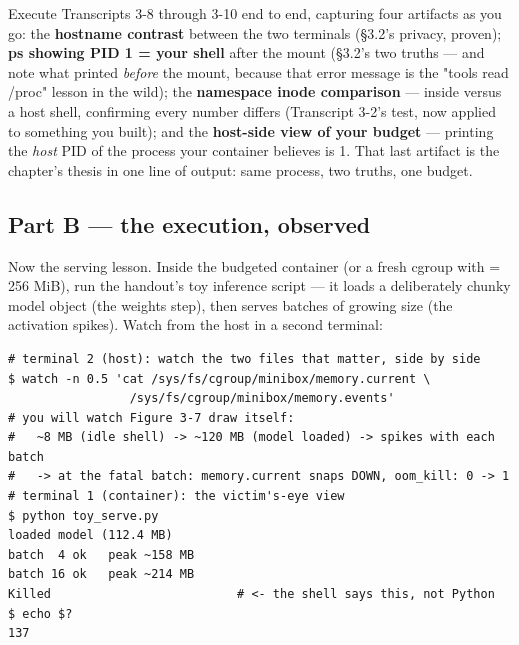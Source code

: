 Execute Transcripts 3-8 through 3-10 end to end, capturing four artifacts as you go: the \textbf{hostname contrast} between the two terminals (§3.2's privacy, proven); \textbf{ps showing PID 1 = your shell} after the  mount (§3.2's two truths — and note what  printed \textit{before} the mount, because that error message is the "tools read /proc" lesson in the wild); the \textbf{namespace inode comparison} —  inside versus a host shell, confirming every number differs (Transcript 3-2's test, now applied to something you built); and the \textbf{host-side view of your budget} —  printing the \textit{host} PID of the process your container believes is 1. That last artifact is the chapter's thesis in one line of output: same process, two truths, one budget.

\subsection*{Part B — the execution, observed}

Now the serving lesson. Inside the budgeted container (or a fresh cgroup with  = 256 MiB), run the handout's toy inference script — it loads a deliberately chunky model object (the weights step), then serves batches of growing size (the activation spikes). Watch from the host in a second terminal:

\begin{terminalbox}
\begin{Verbatim}[breaklines=true,breakanywhere=true,fontsize=\small,formatcom=\color{tbbtermfg},codes=\tbbcodeactive]
# terminal 2 (host): watch the two files that matter, side by side
$ watch -n 0.5 'cat /sys/fs/cgroup/minibox/memory.current \
                 /sys/fs/cgroup/minibox/memory.events'
# you will watch Figure 3-7 draw itself:
#   ~8 MB (idle shell) -> ~120 MB (model loaded) -> spikes with each batch
#   -> at the fatal batch: memory.current snaps DOWN, oom_kill: 0 -> 1
# terminal 1 (container): the victim's-eye view
$ python toy_serve.py
loaded model (112.4 MB)
batch  4 ok   peak ~158 MB
batch 16 ok   peak ~214 MB
Killed                          # <- the shell says this, not Python
$ echo $?
137
\end{Verbatim}
\end{terminalbox}

